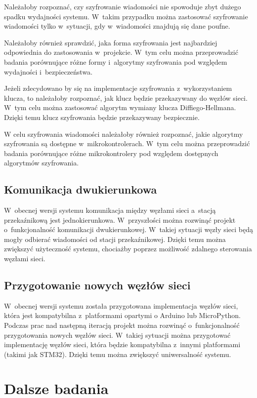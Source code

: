 Należałoby rozpoznać, czy szyfrowanie wiadomości nie spowoduje zbyt dużego spadku wydajności systemu.
W~takim przypadku można zastosować szyfrowanie wiadomości tylko w~sytuacji, gdy w~wiadomości znajdują się dane poufne.

Należałoby również sprawdzić, jaka forma szyfrowania jest najbardziej odpowiednia do zastosowania w~projekcie.
W~tym celu można przeprowadzić badania porównujące różne formy i~algorytmy szyfrowania pod względem wydajności i~bezpieczeństwa.

Jeżeli zdecydowano by się na implementacje szyfrowania z~wykorzystaniem klucza, to należałoby rozpoznać, jak klucz będzie przekazywany do węzłów sieci.
W~tym celu można zastosować algorytm wymiany klucza Diffiego-Hellmana.
Dzięki temu klucz szyfrowania będzie przekazywany bezpiecznie.

W celu szyfrowania wiadomości należałoby również rozpoznać, jakie algorytmy szyfrowania są dostępne w~mikrokontrolerach.
W~tym celu można przeprowadzić badania porównujące różne mikrokontrolery pod względem dostępnych algorytmów szyfrowania.

\subsection{Komunikacja dwukierunkowa}
W~obecnej wersji systemu komunikacja między węzłami sieci a~stacją przekaźnikową jest jednokierunkowa.
W~przyszłości można rozwinąć projekt o~funkcjonalność komunikacji dwukierunkowej.
W~takiej sytuacji węzły sieci będą mogły odbierać wiadomości od stacji przekaźnikowej.
Dzięki temu można zwiększyć użyteczność systemu, chociażby poprzez możliwość zdalnego sterowania węzłami sieci.

\subsection{Przygotowanie nowych węzłów sieci}
W~obecnej wersji systemu została przygotowana implementacja węzłów sieci, która jest kompatybilna z~platformami opartymi o Arduino lub MicroPython.
Podczas prac nad następną iteracją projekt można rozwinąć o~funkcjonalność przygotowania nowych węzłów sieci.
W~takiej sytuacji można przygotować implementację węzłów sieci, która będzie kompatybilna z~innymi platformami (takimi jak STM32).
Dzięki temu można zwiększyć uniwersalność systemu.

\section{Dalsze badania}

